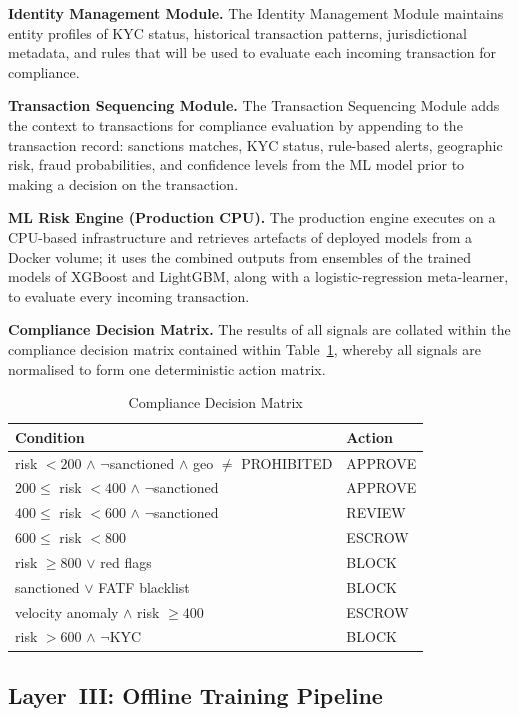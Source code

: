 \documentclass[journal]{IEEEtran}
\begin{document}
\textbf{Identity Management Module.} The Identity Management Module maintains entity profiles of KYC status, historical transaction patterns, jurisdictional metadata, and rules that will be used to evaluate each incoming transaction for compliance.

\textbf{Transaction Sequencing Module.} The Transaction Sequencing Module adds the context to transactions for compliance evaluation by appending to the transaction record: sanctions matches, KYC status, rule-based alerts, geographic risk, fraud probabilities, and confidence levels from the ML model prior to making a decision on the transaction.

\textbf{ML Risk Engine (Production CPU).} The production engine executes on a CPU-based infrastructure and retrieves artefacts of deployed models from a Docker volume; it uses the combined outputs from ensembles of the trained models of XGBoost and LightGBM, along with a logistic-regression meta-learner, to evaluate every incoming transaction.

\textbf{Compliance Decision Matrix.} The results of all signals are collated within the compliance decision matrix contained within Table~\ref{tab:decision_matrix}, whereby all signals are normalised to form one deterministic action matrix.

\begin{table}[!t]
\centering
\caption{Compliance Decision Matrix}
\label{tab:decision_matrix}
\begin{tabular}{p{5.2cm}l}
\toprule
\textbf{Condition} & \textbf{Action} \\
\midrule
risk $< 200$ $\land$ $\neg$sanctioned $\land$ geo $\neq$ PROHIBITED & APPROVE \\
$200 \leq$ risk $< 400$ $\land$ $\neg$sanctioned & APPROVE \\
$400 \leq$ risk $< 600$ $\land$ $\neg$sanctioned & REVIEW \\
$600 \leq$ risk $< 800$ & ESCROW \\
risk $\geq 800$ $\lor$ red flags & BLOCK \\
sanctioned $\lor$ FATF blacklist & BLOCK \\
velocity anomaly $\land$ risk $\geq 400$ & ESCROW \\
risk $> 600$ $\land$ $\neg$KYC & BLOCK \\
\bottomrule
\end{tabular}
\end{table}

\subsection{Layer~III: Offline Training Pipeline}
\end{document}
